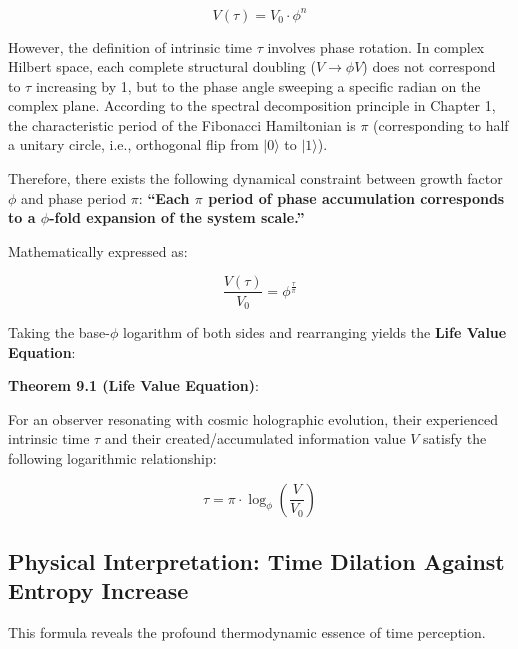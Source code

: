 \[V(\tau) = V_0 \cdot \phi^{n}\]

However, the definition of intrinsic time $\tau$ involves phase rotation. In complex Hilbert space, each complete structural doubling ($V \to \phi V$) does not correspond to $\tau$ increasing by 1, but to the phase angle sweeping a specific radian on the complex plane.
According to the spectral decomposition principle in Chapter 1, the characteristic period of the Fibonacci Hamiltonian is $\pi$ (corresponding to half a unitary circle, i.e., orthogonal flip from $|0\rangle$ to $|1\rangle$).

Therefore, there exists the following dynamical constraint between growth factor $\phi$ and phase period $\pi$:
\textbf{``Each $\pi$ period of phase accumulation corresponds to a $\phi$-fold expansion of the system scale.''}

Mathematically expressed as:

\[\frac{V(\tau)}{V_0} = \phi^{\frac{\tau}{\pi}}\]

Taking the base-$\phi$ logarithm of both sides and rearranging yields the \textbf{Life Value Equation}:

\textbf{Theorem 9.1 (Life Value Equation)}:

For an observer resonating with cosmic holographic evolution, their experienced intrinsic time $\tau$ and their created/accumulated information value $V$ satisfy the following logarithmic relationship:

\[\tau = \pi \cdot \log_{\phi} \left( \frac{V}{V_0} \right)\]

\subsection{Physical Interpretation: Time Dilation Against Entropy Increase}

This formula reveals the profound thermodynamic essence of time perception.

